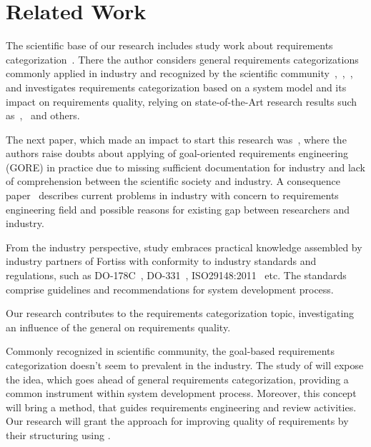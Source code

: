 \section{Related Work}
\label{sec:relatedwork} 
The scientific base of our research includes study work about requirements categorization~\cite{3Eckhardt}. There the author considers general requirements categorizations commonly applied in industry and recognized by the scientific community~\cite{2Pohl},~\cite{4Robertson},~\cite{5Sommerville},~\cite{6Lamsweerde} and investigates requirements categorization based on a system model and its impact on requirements quality, relying on state-of-the-Art research results such as~\cite{10Broy},~\cite{11Mager} and others. 

The next paper, which made an impact to start this research was~\cite{15Goals}, where the authors raise doubts about applying of goal-oriented requirements engineering (GORE) in practice due to missing sufficient documentation for industry and lack of comprehension between the scientific society and industry. A consequence paper~\cite{16NaPiRe} describes current problems in industry with concern to requirements engineering field and possible reasons for existing gap between researchers and industry.

From the industry perspective, \cbc study embraces practical knowledge assembled by industry partners of Fortiss with conformity to industry standards and regulations, such as DO-178C~\cite{7DO-178C}, DO-331~\cite{8DO-331}, ISO29148:2011~\cite{9ISO29148} etc. The standards comprise guidelines and recommendations for system development process.

Our research contributes to the requirements categorization topic, investigating an influence of the general \cbc on requirements quality.

Commonly recognized in scientific community, the goal-based requirements categorization doesn't seem to prevalent in the industry. The study of \cbc will expose the idea, which goes ahead of general requirements categorization, providing a common instrument within system development process. Moreover, this concept will bring a method, that guides requirements engineering and review activities. Our research will grant the approach for improving quality of requirements by their structuring using \cbc. 



